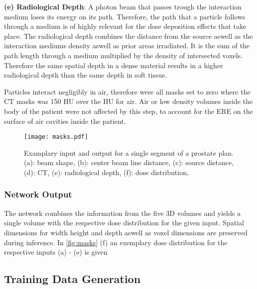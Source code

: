 \begin{hangingpar}\label{par:radiological_depth}
    \item \textbf{(e) Radiological Depth}: 
    A photon beam that passes trough the interaction medium loses its energy on its path. 
    Therefore, the path that a particle follows through a medium is of highly relevant for the dose deposition effects that take place. 
    The radiological depth combines the distance from the source aswell as the interaction mediums density aswell as prior areas irradiated. 
    It is the sum of the path length through a medium multiplied by the density of intersected voxels. 
    Therefore the same spatial depth in a dense material results in a higher radiological depth than the same depth in soft tissue.
\end{hangingpar}

Particles interact negligibly in air, therefore were all masks set to zero where the CT masks was 150 HU over the HU for air. Air or low density volumes inside the body of the patient were not affected by this step, to account for the \ac{ERE} on the surface of air cavities inside the patient. 

\begin{figure}
    \centering
    \texttt{[image: masks.pdf]}
    \caption{Examplary input and output for a single segment of a prostate plan. (a): beam shape, (b): center beam line distance, (c): source distance, (d): CT, (e): radiological depth, (f): dose distribution, }\label{fig:masks}
\end{figure}

\subsubsection{Network Output}

The network combines the information from the five 3D volumes and yields a single volume with the respective dose distribution for the given input. Spatial dimensions for width height and depth aswell as voxel dimensions are preserved during inference. In \autoref{fig:masks} (f) an exemplary dose distribution for the respective inputs (a) - (e) is given

\subsection{Training Data Generation}

